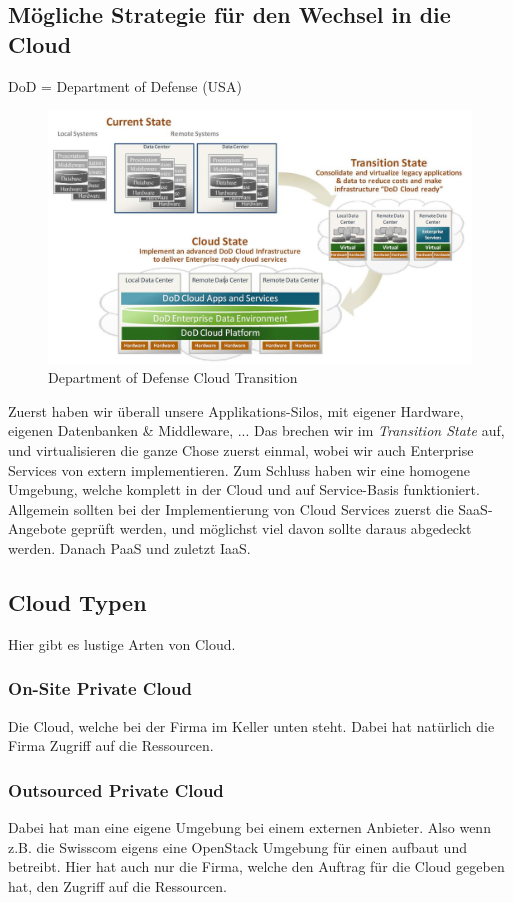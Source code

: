 \subsection{Mögliche Strategie für den Wechsel in die Cloud}
DoD = Department of Defense (USA)
\begin{figure}
\centering
\includegraphics[width=0.7\linewidth]{fig/dod_cloud_transition}
\caption{Department of Defense Cloud Transition}
\label{fig:dod_cloud_transition}
\end{figure}
Zuerst haben wir überall unsere Applikations-Silos, mit eigener Hardware, eigenen Datenbanken \& Middleware, ... Das brechen wir im \textit{Transition State} auf, und virtualisieren die ganze Chose zuerst einmal, wobei wir auch Enterprise Services von extern implementieren. Zum Schluss haben wir eine homogene Umgebung, welche komplett in der Cloud und auf Service-Basis funktioniert.\\
Allgemein sollten bei der Implementierung von Cloud Services zuerst die SaaS-Angebote geprüft werden, und möglichst viel davon sollte daraus abgedeckt werden. Danach PaaS und zuletzt IaaS.
\subsection{Cloud Typen}
Hier gibt es lustige Arten von Cloud.
\subsubsection{On-Site Private Cloud}
Die Cloud, welche bei der Firma im Keller unten steht. Dabei hat natürlich die Firma Zugriff auf die Ressourcen.
\subsubsection{Outsourced Private Cloud}
Dabei hat man eine eigene Umgebung bei einem externen Anbieter. Also wenn z.B. die Swisscom eigens eine OpenStack Umgebung für einen aufbaut und betreibt. Hier hat auch nur die Firma, welche den Auftrag für die Cloud gegeben hat, den Zugriff auf die Ressourcen.
